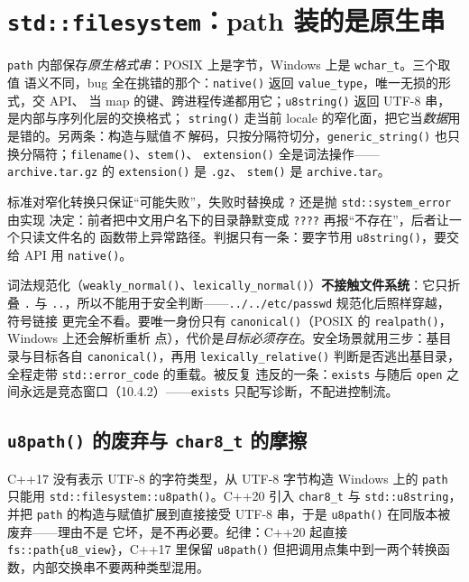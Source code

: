 \documentclass[12pt,a4paper,fontset=fandol]{ctexbook}
\newcommand{\cpp}[1]{C++#1}
\newcommand{\Fn}[1]{\texttt{#1()}}
\newcommand{\Tp}[1]{\texttt{#1}}
\begin{document}
\section{\Tp{std::filesystem}：path 装的是原生串}

\Tp{path} 内部保存\emph{原生格式串}：POSIX 上是字节，Windows 上是 \Tp{wchar\_t}。三个取值
语义不同，bug 全在挑错的那个：\Fn{native} 返回 \Tp{value\_type}，唯一无损的形式，交 API、
当 map 的键、跨进程传递都用它；\Fn{u8string} 返回 UTF-8 串，是内部与序列化层的交换格式；
\Fn{string} 走当前 locale 的窄化面，把它当\emph{数据}用是错的。另两条：构造与赋值\emph{不}
解码，只按分隔符切分，\Fn{generic\_string} 也只换分隔符；\Fn{filename}、\Fn{stem}、
\Fn{extension} 全是词法操作——\Tp{archive.tar.gz} 的 \Fn{extension} 是 \Tp{.gz}、 \Fn{stem} 是 \Tp{archive.tar}。

\begin{warning}[title={\Fn{string} 是 Windows 上丢信息的那一个}]
标准对窄化转换只保证``可能失败''，失败时替换成 \Tp{?} 还是抛 \Tp{std::system\_error} 由实现
决定：前者把中文用户名下的目录静默变成 \Tp{????} 再报``不存在''，后者让一个只读文件名的
函数带上异常路径。判据只有一条：要字节用 \Fn{u8string}，要交给 API 用 \Fn{native}。
\end{warning}

词法规范化（\Fn{weakly\_normal}、\Fn{lexically\_normal}）\textbf{不接触文件系统}：它只折叠
\Tp{.} 与 \Tp{..}，所以不能用于安全判断——\Tp{../../etc/passwd} 规范化后照样穿越，符号链接
更完全不看。要唯一身份只有 \Fn{canonical}（POSIX 的 \Fn{realpath}，Windows 上还会解析重析
点），代价是\emph{目标必须存在}。安全场景就用三步：基目录与目标各自 \Fn{canonical}，再用
\Fn{lexically\_relative} 判断是否逃出基目录，全程走带 \Tp{std::error\_code} 的重载。被反复
违反的一条：\Tp{exists} 与随后 \Tp{open} 之间永远是竞态窗口（10.4.2）——\Tp{exists} 只配写诊断，不配进控制流。

\subsection{\Fn{u8path} 的废弃与 \Tp{char8\_t} 的摩擦}

\cpp{17} 没有表示 UTF-8 的字符类型，从 UTF-8 字节构造 Windows 上的 \Tp{path} 只能用
\Fn{std::filesystem::u8path}。\cpp{20} 引入 \Tp{char8\_t} 与 \Tp{std::u8string}，并把
\Tp{path} 的构造与赋值扩展到直接接受 UTF-8 串，于是 \Fn{u8path} 在同版本被废弃——理由不是
它坏，是不再必要。纪律：\cpp{20} 起直接 \Tp{fs::path\{u8\_view\}}，\cpp{17} 里保留
\Fn{u8path} 但把调用点集中到一两个转换函数，内部交换串不要两种类型混用。
\end{document}
